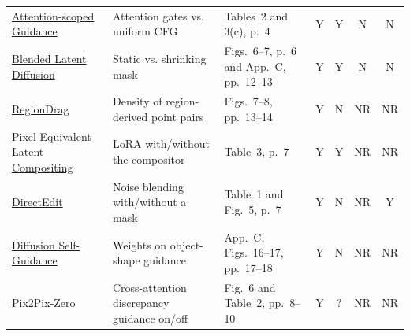 \begin{table}[t]
{\begin{tabularx}{\textwidth}{@{}p{}X p{}cccc@{}}
\href{https://arxiv.org/pdf/2609.37492v1}{Attention-scoped Guidance} & Attention gates vs. uniform CFG & Tables~2 and 3(c), p.~4 & Y & Y & N & N\\
\href{https://arxiv.org/pdf/2206.02779v2}{Blended Latent Diffusion} & Static vs. shrinking mask & Figs.~6--7, p.~6 and App.~C, pp.~12--13 & Y & Y & N & N\\
\href{https://www.ecva.net/papers/eccv_2024/papers_ECCV/papers/02585.pdf}{RegionDrag} & Density of region-derived point pairs & Figs.~7--8, pp.~13--14 & Y & N & NR & NR\\
\href{https://openaccess.thecvf.com/content/CVPR2026/papers/Bradbury_Your_Latent_Mask_is_Wrong_Pixel-Equivalent_Latent_Compositing_for_Diffusion_CVPR_2026_paper.pdf}{Pixel-Equivalent Latent Compositing} & LoRA with/without the compositor & Table~3, p.~7 & Y & Y & NR & NR\\
\href{https://raw.githubusercontent.com/mlresearch/v306/main/assets/yang26cy/yang26cy.pdf}{DirectEdit} & Noise blending with/without a mask & Table~1 and Fig.~5, p.~7 & Y & N & NR & Y\\
\href{https://proceedings.neurips.cc/paper_files/paper/2023/file/3469b211b829b39d2b0cfd3b880a869c-Paper-Conference.pdf}{Diffusion Self-Guidance} & Weights on object-shape guidance & App.~C, Figs.~16--17, pp.~17--18 & Y & N & NR & NR\\
\href{https://arxiv.org/pdf/2302.03027}{Pix2Pix-Zero} & Cross-attention discrepancy guidance on/off & Fig.~6 and Table~2, pp.~8--10 & Y & ? & NR & NR\\
\bottomrule\end{tabularx}}
\end{table}

